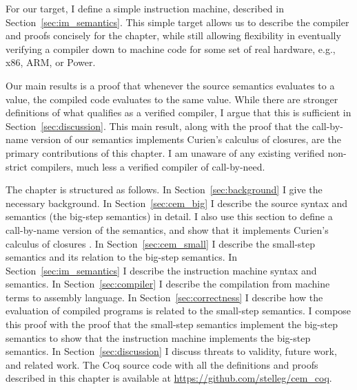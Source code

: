 For our target, I define a simple instruction machine, described in
Section~\ref{sec:im_semantics}. This simple target allows us to describe the
compiler and proofs concisely for the chapter, while still allowing
flexibility in eventually verifying a compiler down to machine code for some
set of real hardware, e.g., x86, ARM, or Power. 

Our main results is a proof that whenever the source semantics evaluates to a
value, the compiled code evaluates to the same value. While there are stronger
definitions of what qualifies as a verified compiler, I argue that this is
sufficient in Section~\ref{sec:discussion}. This main result, along with the
proof that the call-by-name version of our semantics implements Curien's
calculus of closures, are the primary contributions of this chapter. I am
unaware of any existing verified non-strict compilers, much less a verified
compiler of call-by-need. 

The chapter is structured as follows. In Section~\ref{sec:background} I give the
necessary background. In Section~\ref{sec:cem_big} I describe the source syntax
and semantics (the big-step \ce semantics) in detail.  I also use
this section to define a call-by-name version of the semantics, and
show that it implements Curien's calculus of closures \cite{curien1991abstract}.  In
Section~\ref{sec:cem_small} I describe the small-step \ce semantics
and its relation to the big-step semantics. In Section~\ref{sec:im_semantics}
I describe the instruction machine syntax and semantics. In
Section~\ref{sec:compiler} I describe the compilation from machine terms to
assembly language. In Section~\ref{sec:correctness} I describe how the evaluation
of compiled programs is related to the small-step \ce semantics. I 
compose this proof with the proof that the small-step semantics implement the
big-step semantics to show that the instruction machine implements the big-step
semantics. In Section~\ref{sec:discussion} I discuss threats to validity,
future work, and related work. The Coq source code with all the definitions and
proofs described in this chapter is available at
\url{https://github.com/stelleg/cem\_coq}. 
